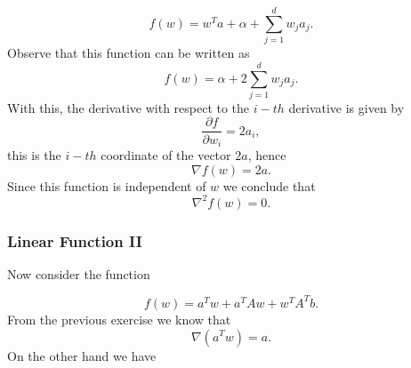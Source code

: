 \documentclass{article}
\begin{document}
\begin{equation*}
f(w)=w^{T}a+\alpha+\sum_{j=1}^{d}w_{j}a_{j}.
\end{equation*}
Observe that this function can be written as 
\begin{equation*}
f(w)=\alpha+2\sum_{j=1}^{d}w_{j}a_{j}.
\end{equation*}
With this, the derivative with respect to the $i-th$ derivative is given by
\begin{equation*}
\frac{\partial f}{\partial w_{i}}=2a_{i},
\end{equation*}
this is the $i-th$ coordinate of the vector $2a$, hence
\begin{equation*}
\nabla f(w)=2a.
\end{equation*}
Since this function is independent of $w$ we conclude that
\begin{equation*}
\nabla^{2} f(w)=0.
\end{equation*}

\subsubsection{Linear Function II}
Now consider the function

\begin{equation*}
f(w)=a^{T}w+a^{T}Aw+w^{T}A^{T}b.
\end{equation*}
From the previous exercise we know that 
\begin{equation}\label{eqnpartI}
\nabla(a^{T}w)=a.
\end{equation}
On the other hand we have
\end{document}
